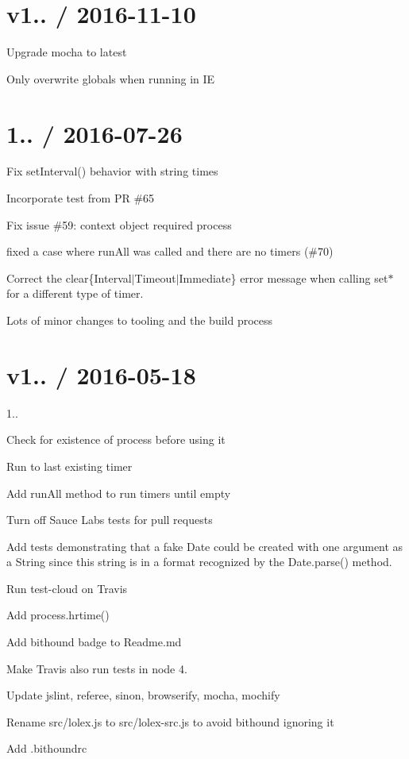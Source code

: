 \section*{v1.. / 2016-\/11-\/10 }


\begin{DoxyItemize}
\item Upgrade mocha to latest
\item Only overwrite globals when running in IE
\end{DoxyItemize}

\section*{1.. / 2016-\/07-\/26 }


\begin{DoxyItemize}
\item Fix set\+Interval() behavior with string times
\item Incorporate test from PR \#65
\item Fix issue \#59\+: context object required \textquotesingle{}process\textquotesingle{}
\item fixed a case where run\+All was called and there are no timers (\#70)
\item Correct the clear\{Interval$\vert$\+Timeout$\vert$\+Immediate\} error message when calling {\ttfamily set$\ast$} for a different type of timer.
\item Lots of minor changes to tooling and the build process
\end{DoxyItemize}

\section*{v1.. / 2016-\/05-\/18 }


\begin{DoxyItemize}
\item 1..
\item Check for existence of {\ttfamily process} before using it
\item Run to last existing timer
\item Add run\+All method to run timers until empty
\item Turn off Sauce Labs tests for pull requests
\item Add tests demonstrating that a fake Date could be created with one argument as a String since this string is in a format recognized by the Date.\+parse() method.
\item Run test-\/cloud on Travis
\item Add process.\+hrtime()
\item Add bithound badge to Readme.\+md
\item Make Travis also run tests in node 4.
\item Update jslint, referee, sinon, browserify, mocha, mochify
\item Rename src/lolex.\+js to src/lolex-\/src.\+js to avoid bithound ignoring it
\item Add .bithoundrc
\end{DoxyItemize}


